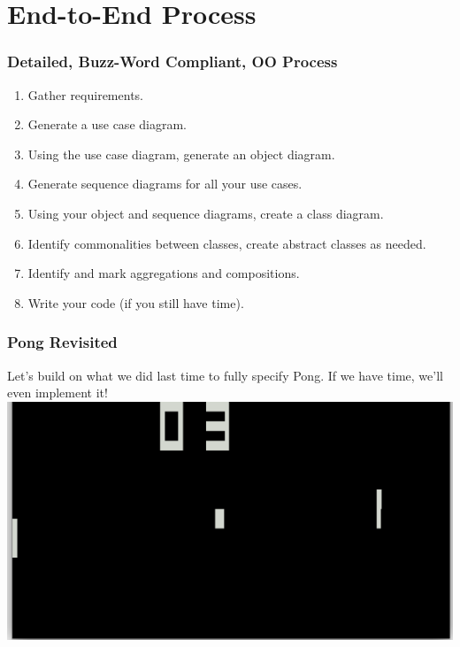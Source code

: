 \documentclass{beamer}
\begin{document}
\section{End-to-End Process}
\begin{frame}
    \frametitle{Detailed, Buzz-Word Compliant, OO Process}
    \begin{enumerate}[<+->]
        \item Gather requirements.
        \item Generate a use case diagram.
        \item Using the use case diagram, generate an object diagram.
        \item Generate sequence diagrams for all your use cases.
        \item Using your object and sequence diagrams, create a class diagram.
        \item Identify commonalities between classes, create abstract 
            classes as needed.
        \item Identify and mark aggregations and compositions.
        \item Write your code (if you still have time).
    \end{enumerate}
\end{frame}

\begin{frame}
    \frametitle{Pong Revisited}
    Let's build on what we did last time to fully specify Pong.  
    If we have time, we'll even implement it!
    \includegraphics[width=\textwidth]{images/pong}
\end{frame}
\end{document}
